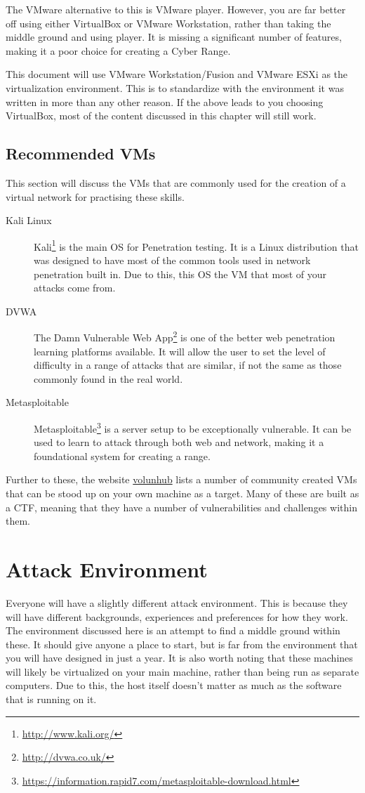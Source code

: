 			The VMware alternative to this is VMware player. 
			However, you are far better off using either VirtualBox or VMware Workstation, rather than taking the middle ground and using player. 
			It is missing a significant number of features, making it a poor choice for creating a Cyber Range. 

			This document will use VMware Workstation/Fusion and VMware ESXi as the virtualization environment. 
			This is to standardize with the environment it was written in more than any other reason. 
			If the above leads to you choosing VirtualBox, most of the content discussed in this chapter will still work. 
		
		\subsection{Recommended VMs}
			This section will discuss the VMs that are commonly used for the creation of a virtual network for practising these skills. 
			\begin{description}
				\item[Kali Linux] Kali\footnote{\url{http://www.kali.org/}} is the main OS for Penetration testing. 
					It is a Linux distribution that was designed to have most of the common tools used in network penetration built in. 
					Due to this, this OS the VM that most of your attacks come from. 
				\item[DVWA] The Damn Vulnerable Web App\footnote{\url{http://dvwa.co.uk/}} is one of the better web penetration learning platforms available. 
					It will allow the user to set the level of difficulty in a range of attacks that are similar, if not the same as those commonly found in the real world. 
				\item[Metasploitable] Metasploitable\footnote{\url{https://information.rapid7.com/metasploitable-download.html}} is a server setup to be exceptionally vulnerable. 
					It can be used to learn to attack through both web and network, making it a foundational system for creating a range. 
			\end{description}

			Further to these, the website \href{vulnhub.com}{volunhub} lists a number of community created VMs that can be stood up on your own machine as a target. 
			Many of these are built as a CTF, meaning that they have a number of vulnerabilities and challenges within them. 

	\section{Attack Environment}
		Everyone will have a slightly different attack environment. 
		This is because they will have different backgrounds, experiences and preferences for how they work. 
		The environment discussed here is an attempt to find a middle ground within these. 
		It should give anyone a place to start, but is far from the environment that you will have designed in just a year. 
		It is also worth noting that these machines will likely be virtualized on your main machine, rather than being run as separate computers\cite{playbook}.  
		Due to this, the host itself doesn't matter as much as the software that is running on it. 

